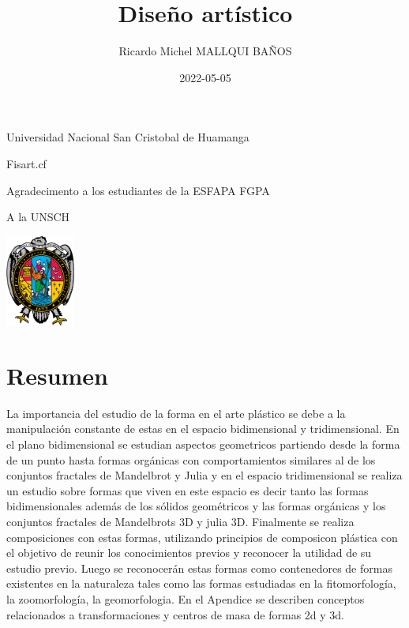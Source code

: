 \documentclass[
  16pt,
]{krantz}
\title{Diseño artístico}
\author{Ricardo Michel MALLQUI BAÑOS}
\date{2022-05-05}
\theoremstyle{definition}
\theoremstyle{definition}
\theoremstyle{definition}
\theoremstyle{definition}
\theoremstyle{remark}
\begin{document}
\maketitle

\thispagestyle{empty}
\begin{flushright}
Universidad Nacional San Cristobal de Huamanga

Fisart.cf

Agradecimento a los estudiantes de la ESFAPA FGPA

A la UNSCH

\includegraphics[height=3cm]{U.pdf}
\end{flushright}

{
\hypersetup{linkcolor=}
\setcounter{tocdepth}{2}
\tableofcontents
}
\listoftables
\listoffigures
\newcommand{\N}{\mathbb{N}}
\newcommand{\R}{\mathbb{R}}
\newcommand{\CC}{\mathbb{C}}
\newcommand{\I}{\mathbb{I}}
\newcommand{\f}{\mathbb{f}}
\newcommand{\X}{\mathbb{X}}
\newcommand{\D}{\mathbb{D}}
\newcommand{\Z}{\mathbb{Z}}
\newcommand{\Q}{\mathbb{Q}}
\newcommand{\norm}[1]{\left\Vert#1\right\Vert}
\newcommand{\abs}[1]{\left\vert#1\right\vert}
\newcommand{\set}[1]{\left\{#1\right\}}
\newcommand{\seq}[1]{\left<#1\right>}
\newcommand{\co}[1]{\left[#1\right]}
\newcommand{\cc}[1]{\left(#1\right)}
\newcommand{\J}{\mathcal{J}}
\newcommand{\K}{\mathcal{K}}
\newcommand{\M}{\mathcal{M}}
\newcommand{\F}{\mathcal{F}}

\hypertarget{resumen}{%
\chapter*{Resumen}\label{resumen}}


La importancia del estudio de la forma en el arte plástico se debe a la manipulación constante de estas en el espacio bidimensional y tridimensional. En el plano bidimensional se estudian aspectos geometricos partiendo desde la forma de un punto hasta formas orgánicas con comportamientos similares al de los conjuntos fractales de Mandelbrot y Julia y en el espacio tridimensional se realiza un estudio sobre formas que viven en este espacio es decir tanto las formas bidimensionales además de los sólidos geométricos y las formas orgánicas y los conjuntos fractales de Mandelbrots 3D y julia 3D. Finalmente se realiza composiciones con estas formas, utilizando principios de composicon plástica con el objetivo de reunir los conocimientos previos y reconocer la utilidad de su estudio previo. Luego se reconocerán estas formas como contenedores de formas existentes en la naturaleza tales como las formas estudiadas en la fitomorfología, la zoomorfología, la geomorfologia. En el Apendice se describen conceptos relacionados a transformaciones y centros de masa de formas 2d y 3d.
\end{document}
